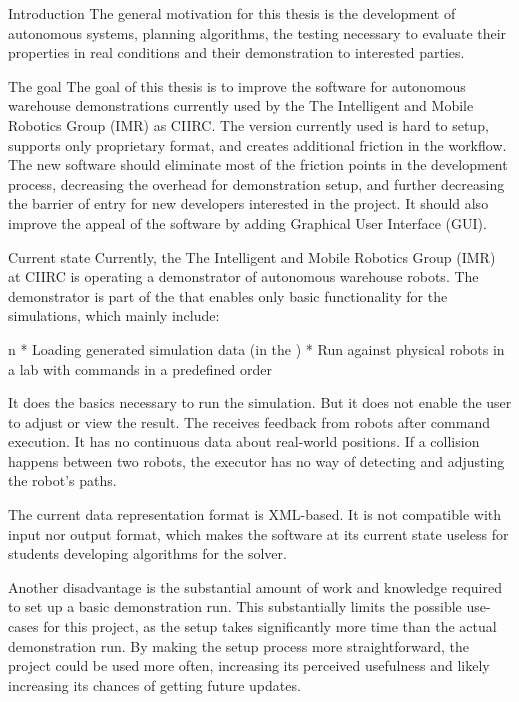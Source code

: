 \chap Introduction
The general motivation for this thesis is the development of autonomous systems, planning algorithms, the testing necessary to evaluate their properties in real conditions and their demonstration to interested parties.

\sec The goal
The goal of this thesis is to improve the software for autonomous warehouse demonstrations currently used by the The Intelligent and Mobile Robotics Group (IMR) as CIIRC. The version currently used is hard to setup, supports only proprietary format, and creates additional friction in the workflow. The new software should eliminate most of the friction points in the development process, decreasing the overhead for demonstration setup, and further decreasing the barrier of entry for new developers interested in the project. It should also improve the appeal of the software by adding Graphical User Interface (GUI).

\sec Current state
Currently, the The Intelligent and Mobile Robotics Group (IMR) at CIIRC is operating a demonstrator of autonomous warehouse robots. The demonstrator is part of the {\oldRepo} that enables only basic functionality for the simulations, which mainly include:

\begitems \style n
    * Loading generated simulation data (in the {\oldFormat})
    * Run against physical robots in a lab with commands in a predefined order
\enditems

It does the basics necessary to run the simulation. But it does not enable the user to adjust or view the result. The {\oldRepo} receives feedback from robots after command execution. It has no continuous data about real-world positions. If a collision happens between two robots, the executor has no way of detecting and adjusting the robot's paths.

The current data representation format is XML-based. It is not compatible with {\mapfIR} input nor output format, which makes the software at its current state useless for students developing algorithms for the {\mapfIR} solver. 

Another disadvantage is the substantial amount of work and knowledge required to set up a basic demonstration run. This substantially limits the possible use-cases for this project, as the setup takes significantly more time than the actual demonstration run. By making the setup process more straightforward, the project could be used more often, increasing its perceived usefulness and likely increasing its chances of getting future updates.

